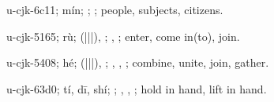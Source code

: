 \begin{multicols}{2}
{\cjkgGlue{}u-cjk-6c11; mín; \cjkgGlue{}; \cjkgGlue{}; people, subjects, citizens.

\cjkgGlue{}u-cjk-5165; rù; \cjkgGlue{}\cjkgGlue{}(\cjkgGlue{}|\cjkgGlue{}|\cjkgGlue{}|\cjkgGlue{}), \cjkgGlue{}\cjkgGlue{}\cjkgGlue{}; \cjkgGlue{}, \cjkgGlue{}; enter, come in(to), join.

\cjkgGlue{}u-cjk-5408; hé; \cjkgGlue{}\cjkgGlue{}(\cjkgGlue{}|\cjkgGlue{}|\cjkgGlue{}|\cjkgGlue{}), \cjkgGlue{}; \cjkgGlue{}, \cjkgGlue{}, \cjkgGlue{}; combine, unite, join, gather.

\cjkgGlue{}u-cjk-63d0; tí, dī, shí; \cjkgGlue{}\cjkgGlue{}\cjkgGlue{}; \cjkgGlue{}, \cjkgGlue{}, \cjkgGlue{}; hold in hand, lift in hand.

}
\end{multicols}
